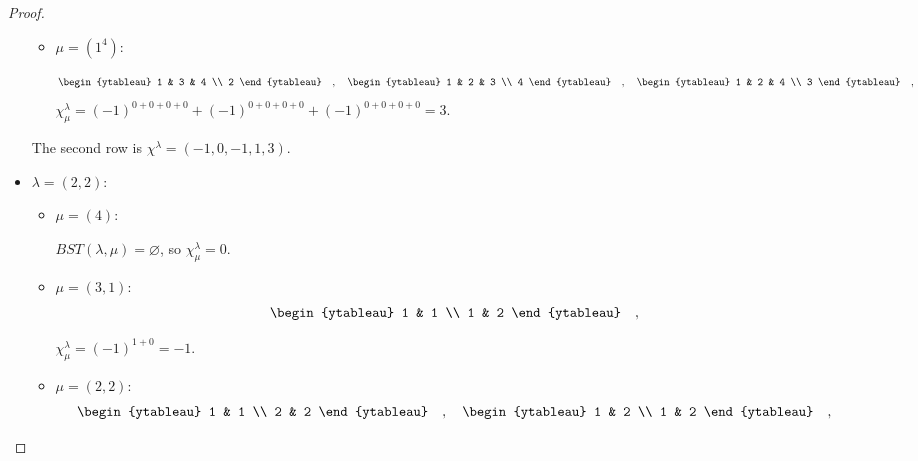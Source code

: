 \documentclass[8pt]{extarticle}
\newcommand{\<}{\langle}
\renewcommand{\>}{\rangle}
\renewcommand{\emptyset}{\varnothing}
\theoremstyle{definition}
\begin{document}
\begin{proof}
\begin{itemize}
\begin{itemize}
    \item
      $\mu = (1^4)$:
      
      \begin{align*}
        \begin{ytableau}
          1 & 3 & 4 \\
          2
        \end{ytableau}\quad,\quad
        \begin{ytableau}
          1 & 2 & 3 \\
          4
        \end{ytableau}\quad,\quad
        \begin{ytableau}
          1 & 2 & 4 \\
          3
        \end{ytableau}\quad,                
      \end{align*}
      $\chi_{\mu}^{\lambda}  = (-1)^{0+0+0+0} + (-1)^{0+0+0+0} +(-1)^{0+0+0+0} = 3$.

    \end{itemize}
    The second row is $\chi^{\lambda} = (-1,0,-1,1,3). $    

  \item
    $\lambda = (2,2)$:
    
    \begin{itemize}
      
    \item
      $\mu = (4)$:
      
      $BST(\lambda,\mu) = \emptyset$, so $\chi_{\mu}^{\lambda} = 0$.

    \item
      $\mu = (3,1)$:
      \begin{align*}
        \begin{ytableau}
          1 & 1 \\
          1 & 2
        \end{ytableau}\quad,\quad
      \end{align*}
      
      $\chi_{\mu}^{\lambda} = (-1)^{1+0} = -1$.

    \item
      $\mu = (2,2)$:
      \begin{align*}
        \begin{ytableau}
          1 & 1 \\
          2 & 2 
        \end{ytableau}\quad,\quad
        \begin{ytableau}
          1 & 2 \\
          1 & 2 
        \end{ytableau}\quad,\quad        
      \end{align*}


\end{itemize}
\end{itemize}
\end{proof}
\end{document}
